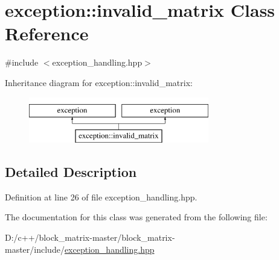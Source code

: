 \hypertarget{classexception_1_1invalid__matrix}{}\section{exception\+:\+:invalid\+\_\+matrix Class Reference}
\label{classexception_1_1invalid__matrix}


{\ttfamily \#include $<$exception\+\_\+handling.\+hpp$>$}

Inheritance diagram for exception\+:\+:invalid\+\_\+matrix\+:\begin{figure}[H]
\begin{center}
\leavevmode
\includegraphics[height=2.000000cm]{classexception_1_1invalid__matrix}
\end{center}
\end{figure}


\subsection{Detailed Description}


Definition at line 26 of file exception\+\_\+handling.\+hpp.



The documentation for this class was generated from the following file\+:\begin{DoxyCompactItemize}
\item 
D\+:/c++/block\+\_\+matrix-\/master/block\+\_\+matrix-\/master/include/\mbox{\hyperlink{include_2exception__handling_8hpp}{exception\+\_\+handling.\+hpp}}\end{DoxyCompactItemize}
